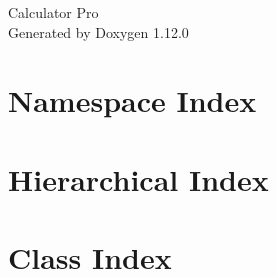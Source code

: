 \documentclass[twoside]{book}
\newcommand{\+}{\discretionary{\mbox{\scriptsize$\hookleftarrow$}}{}{}}
\newcommand{\clearemptydoublepage}{%
    \newpage{\pagestyle{empty}\cleardoublepage}%
  }
\begin{document}
  \raggedbottom
    \hypersetup{pageanchor=false,
                bookmarksnumbered=true,
                pdfencoding=unicode
               }
  \begin{titlepage}
  \vspace*{7cm}
  \begin{center}%
  {\Large Calculator Pro}\\
  \vspace*{1cm}
  {\large Generated by Doxygen 1.12.0}\\
  \end{center}
  \end{titlepage}
  \clearemptydoublepage
  \tableofcontents
  \clearemptydoublepage
  \hypersetup{pageanchor=true}
\chapter{Namespace Index}

\chapter{Hierarchical Index}

\chapter{Class Index}

\end{document}
